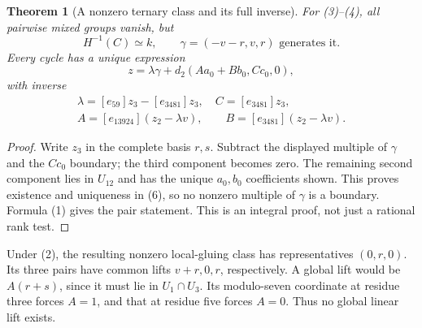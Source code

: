 \documentclass[10pt,a4paper]{article}
\newtheorem{theorem}{Theorem}
\begin{document}
\begin{theorem}[A nonzero ternary class and its full inverse]
For (3)--(4), all pairwise mixed groups vanish, but
\[
 \boxed{H^{-1}(C)\simeq k,\qquad\gamma=(-v-r,v,r)\text{ generates it}.} \tag{5}
\]
Every cycle has a unique expression
\[
 z=\lambda\gamma+d_2(Aa_0+Bb_0,Cc_0,0),                   \tag{6}
\]
with inverse
\[
\begin{gathered}
 \lambda=[e_{59}]z_3-[e_{3481}]z_3,\quad C=[e_{3481}]z_3,\\
 A=[e_{13924}](z_2-\lambda v),\qquad
 B=[e_{3481}](z_2-\lambda v).
\end{gathered}
\]
\end{theorem}
\begin{proof}
Write $z_3$ in the complete basis $r,s$. Subtract the displayed multiple
of $\gamma$ and the $Cc_0$ boundary; the third component becomes zero.
The remaining second component lies in $U_{12}$ and has the unique
$a_0,b_0$ coefficients shown. This proves existence and uniqueness in
(6), so no nonzero multiple of $\gamma$ is a boundary. Formula (1) gives
the pair statement. This is an integral proof, not just a rational rank test.
\end{proof}
Under (2), the resulting nonzero local-gluing class has representatives
$(0,r,0)$. Its three pairs have common lifts $v+r,0,r$, respectively.
A global lift would be $A(r+s)$, since it must lie in $U_1\cap U_3$.
Its modulo-seven coordinate at residue three forces $A=1$, and that at
residue five forces $A=0$. Thus no global linear lift exists.

\newpage
\end{document}
